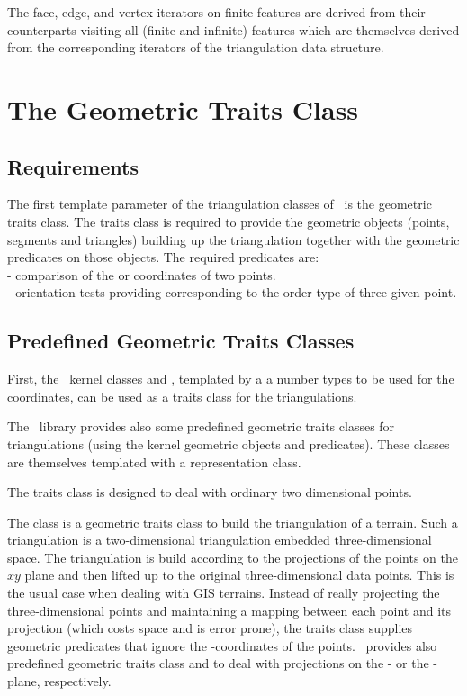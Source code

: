 The face, edge, and vertex iterators on finite features
are derived from their counterparts visiting all (finite and infinite)
features which are themselves derived from the corresponding iterators
of the triangulation data structure.


\section{ The Geometric Traits Class}
\label{I1_Sect_Geom_traits}

\subsection{Requirements}
The first template parameter of the triangulation classes of \cgal\ 
is the geometric traits class. The traits class 
is required to provide
the geometric objects (points, segments and triangles)
building up the triangulation
together with the geometric predicates on those objects.
The required predicates are: \\
- comparison of the  or  coordinates of two points.\\
- orientation tests providing \ccc{CGAL_orientation}
  corresponding to the order type of three given point.

\subsection{Predefined Geometric Traits Classes}
First, the \cgal\  kernel classes  and
,
templated by a  a number types  to be used for the coordinates,
can be used as a traits class for the triangulations.

The \cgal\  library provides also some predefined geometric traits classes
for triangulations (using the kernel geometric objects and predicates).
These classes are themselves templated with a representation class. 

The traits class 
is designed to deal with ordinary  two dimensional points.

The class  
is a geometric traits class to build the triangulation
of a terrain. Such a triangulation is a two-dimensional
triangulation embedded  three-dimensional space.
The triangulation is 
build according to  the projections of the points
on the $xy$ plane  and then lifted up to the original
three-dimensional data points.
This is the usual case when dealing with GIS terrains.
Instead of really projecting the  three-dimensional points and
maintaining a mapping between each point and its projection
 (which costs space and is error prone),
the traits class  supplies geometric predicates that ignore the
-coordinates of the points.
\cgal\ provides also predefined geometric traits class
 and
 to
deal with projections on the
 - or  the -plane,
respectively.

